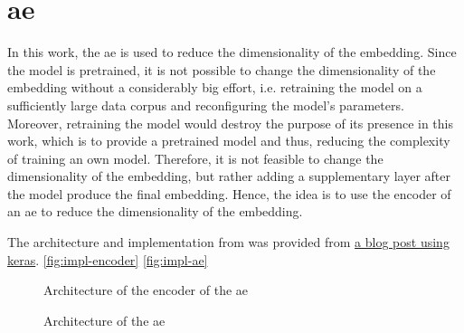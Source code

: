 \section{\acl{ae}}\label{subsec:impl-autoencoder}

In this work, the \ac{ae} is used to reduce the dimensionality of the \infersent{} embedding.
Since the \infersent{} model is pretrained, it is not possible to change the dimensionality of the embedding without a considerably big effort,
i.e. retraining the model on a sufficiently large data corpus and reconfiguring the model's parameters.
Moreover, retraining the model would destroy the purpose of its presence in this work, which is to provide a pretrained model and thus, 
reducing the complexity of training an own model.
Therefore, it is not feasible to change the dimensionality of the \infersent{} embedding, but rather adding a supplementary layer after the model 
produce the final embedding.
Hence, the idea is to use the encoder of an \ac{ae} to reduce the dimensionality of the \infersent{} embedding.

The architecture and implementation from  was provided from 
\href{https://blog.paperspace.com/autoencoder-image-compression-keras/}{a blog post using keras}.
\autoref{fig:impl-encoder} \autoref{fig:impl-ae}

\begin{figure}[h] %
    \centering
    
    \caption{Architecture of the encoder of the \ac{ae}}
    \label{fig:impl-encoder}
\end{figure}

\begin{figure}[h] %
    \centering
    
    \caption{Architecture of the \ac{ae}}
    \label{fig:impl-ae}
\end{figure}

